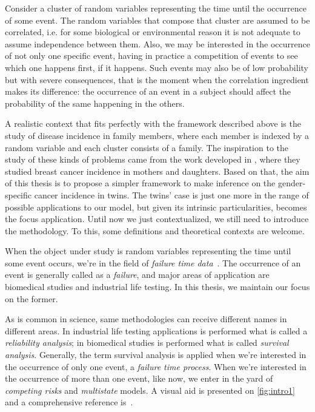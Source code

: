 Consider a cluster of random variables representing the time until the
occurrence of some event. The random variables that compose that cluster
are assumed to be correlated, i.e. for some biological or environmental
reason it is not adequate to assume independence between them. Also, we
may be interested in the occurrence of not only one specific event,
having in practice a competition of events to see which one happens
first, if it happens. Such events may also be of low probability but
with severe consequences, that is the moment when the correlation
ingredient makes its difference: the occurrence of an event in a subject
should affect the probability of the same happening in the others.

A realistic context that fits perfectly with the framework described
above is the study of disease incidence in family members, where each
member is indexed by a random variable and each cluster consists of a
family. The inspiration to the study of these kinds of problems came
from the work developed in , where they studied
breast cancer incidence in mothers and daughters. Based on that, the aim
of this thesis is to propose a simpler framework to make inference on
the gender-specific cancer incidence in twins. The twins' case is just
one more in the range of possible applications to our model, but given
its intrinsic particularities, becomes the focus application. Until now
we just contextualized, we still need to introduce the methodology. To
this, some definitions and theoretical contexts are welcome.

When the object under study is random variables representing the time
until some event occurs, we're in the field of \textit{failure time
  data}~\cite{kalb&prentice}. The occurrence of an event is generally
called as a \textit{failure}, and major areas of application are
biomedical studies and industrial life testing. In this thesis, we
maintain our focus on the former.

As is common in science, same methodologies can receive different names
in different areas. In industrial life testing applications is performed
what is called a \textit{reliability analysis}; in biomedical studies is
performed what is called \textit{survival analysis}. Generally, the term
survival analysis is applied when we're interested in the occurrence of
only one event, a \textit{failure time process}. When we're interested
in the occurrence of more than one event, like now, we enter in the yard
of \textit{competing risks} and \textit{multistate} models. A visual aid
is presented on \autoref{fig:intro1} and a comprehensive reference
is~.

